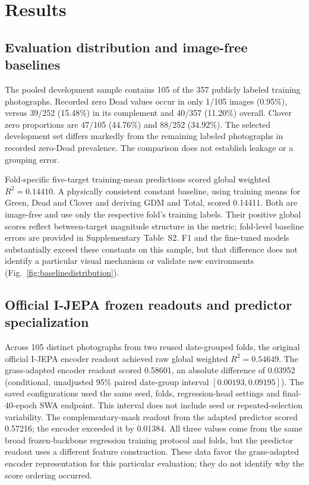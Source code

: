 \documentclass[pdflatex,a4paper,sn-nature]{sn-jnl}
\begin{document}
\section{Results}
\subsection{Evaluation distribution and image-free baselines}
The pooled development sample contains 105 of the 357 publicly labeled training photographs. Recorded zero Dead values occur in only 1/105 images (0.95\%), versus 39/252 (15.48\%) in its complement and 40/357 (11.20\%) overall. Clover zero proportions are 47/105 (44.76\%) and 88/252 (34.92\%). The selected development set differs markedly from the remaining labeled photographs in recorded zero-Dead prevalence. The comparison does not establish leakage or a grouping error.

Fold-specific five-target training-mean predictions scored global weighted $R^2=0.14410$. A physically consistent constant baseline, using training means for Green, Dead and Clover and deriving GDM and Total, scored 0.14411. Both are image-free and use only the respective fold's training labels. Their positive global scores reflect between-target magnitude structure in the metric; fold-level baseline errors are provided in Supplementary Table~S2. F1 and the fine-tuned models substantially exceed these constants on this sample, but that difference does not identify a particular visual mechanism or validate new environments (Fig.~\ref{fig:baselinedistribution}).

\subsection{Official I-JEPA frozen readouts and predictor specialization}
Across 105 distinct photographs from two reused date-grouped folds, the original official I-JEPA encoder readout achieved raw global weighted $R^2=0.54649$. The grass-adapted encoder readout scored 0.58601, an absolute difference of 0.03952 (conditional, unadjusted 95\% paired date-group interval $[0.00193,0.09195]$). The saved configurations used the same seed, folds, regression-head settings and final-40-epoch SWA endpoint. This interval does not include seed or repeated-selection variability. The complementary-mask readout from the adapted predictor scored 0.57216; the encoder exceeded it by 0.01384. All three values come from the same broad frozen-backbone regression training protocol and folds, but the predictor readout uses a different feature construction. These data favor the grass-adapted encoder representation for this particular evaluation; they do not identify why the score ordering occurred.
\end{document}
